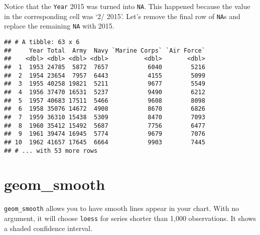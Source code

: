 \documentclass[]{book}
\newenvironment{Shaded}{\begin{snugshade}}{\end{snugshade}}
\newcommand{\KeywordTok}[1]{\textcolor[rgb]{0.13,0.29,0.53}{\textbf{{#1}}}}
\newcommand{\DecValTok}[1]{\textcolor[rgb]{0.00,0.00,0.81}{{#1}}}
\newcommand{\StringTok}[1]{\textcolor[rgb]{0.31,0.60,0.02}{{#1}}}
\newcommand{\NormalTok}[1]{{#1}}
\theoremstyle{definition}
\theoremstyle{definition}
\theoremstyle{remark}
\begin{document}
Notice that the \texttt{Year} 2015 was turned into \texttt{NA}. This
happened because the value in the corresponding cell was `2/ 2015'.
Let's remove the final row of \texttt{NA}s and replace the remaining
\texttt{NA} with 2015.

\begin{Shaded}
\end{Shaded}

\begin{verbatim}
## # A tibble: 63 x 6
##     Year Total  Army  Navy `Marine Corps` `Air Force`
##    <dbl> <dbl> <dbl> <dbl>          <dbl>       <dbl>
##  1  1953 24785  5872  7657           6040        5216
##  2  1954 23654  7957  6443           4155        5099
##  3  1955 40258 19821  5211           9677        5549
##  4  1956 37470 16531  5237           9490        6212
##  5  1957 40683 17511  5466           9608        8098
##  6  1958 35076 14672  4908           8670        6826
##  7  1959 36310 15438  5309           8470        7093
##  8  1960 35412 15492  5687           7756        6477
##  9  1961 39474 16945  5774           9679        7076
## 10  1962 41657 17645  6664           9903        7445
## # ... with 53 more rows
\end{verbatim}

\section{geom\_smooth}\label{geom_smooth}

\texttt{geom\_smooth} allows you to have smooth lines appear in your
chart. With no argument, it will choose \texttt{loess} for series
shorter than 1,000 observations. It shows a shaded confidence interval.

\begin{Shaded}
\end{Shaded}
\end{document}
